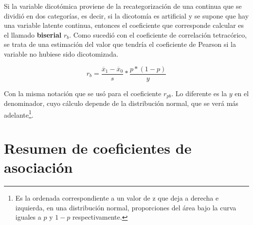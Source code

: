 \documentclass[]{book}
\let\rmarkdownfootnote\footnote%
\def\footnote{\protect\rmarkdownfootnote}
\begin{document}
Si la variable dicotómica proviene de la recategorización de una
continua que se dividió en dos categorías, es decir, si la dicotomía es artificial y se supone que hay una variable latente continua, entonces el coeficiente que corresponde calcular es el llamado \textbf{biserial} \(r_{b}\). Como sucedió con el coeficiente de correlación tetracórico, se trata de una estimación del valor que tendría el coeficiente de Pearson si la variable no hubiese sido dicotomizada.

\[r_{b} = \frac{{\overline{x}}_{1} - {\overline{x}}_{0}}{s}*\frac{p*(1 - p)}{y}\]

Con la misma notación que se usó para el coeficiente \(r_{pb}\). Lo diferente es la \(y\) en el denominador, cuyo cálculo depende de la
distribución normal, que se verá más adelante\footnote{Es la ordenada correspondiente a un valor de z que deja a derecha e izquierda, en una distribución normal, proporciones del área bajo la curva iguales a \(p\) y \(1-p\) respectivamente.}.

\hypertarget{resumen-de-coeficientes-de-asociaciuxf3n}{%
\section{Resumen de coeficientes de asociación}\label{resumen-de-coeficientes-de-asociaciuxf3n}}
\end{document}
